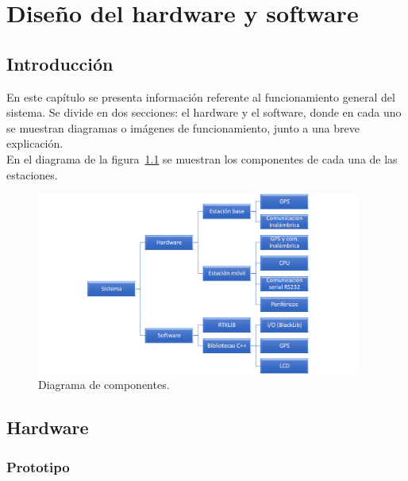 
\chapter{Diseño del hardware y software}
\label{Chap:DisHard} %


\section{Introducción}

En este capítulo se presenta información referente al funcionamiento general del sistema. Se divide en dos secciones: el hardware y el software, donde en cada uno se muestran diagramas o imágenes de funcionamiento, junto a una breve explicación.\\

En el diagrama de la figura~\ref{fig:diagcomp} se muestran los componentes de cada una de las estaciones.

\begin{figure}[H]
\centering
\includegraphics[width=0.95\textwidth]{Figures/DiagramaFinal}
\caption[Diagrama de componentes.]{Diagrama de componentes.}
\label{fig:diagcomp}
\end{figure}

\section{Hardware}

\subsection{Prototipo}

